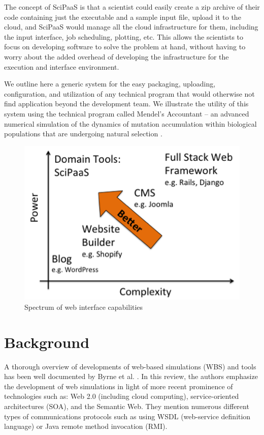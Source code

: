 \documentclass[10pt,reprint]{socc14}
\begin{document}
The concept of SciPaaS is that a scientist could easily create a zip archive of their code containing just the executable and a sample input file, upload it to the cloud, and SciPaaS would manage all the cloud infrastructure for them, including the input interface, job scheduling, plotting, etc.  This allows the scientists to focus on developing software to solve the problem at hand, without having to worry about the added overhead of developing the infrastructure for the execution and interface environment.

We outline here a generic system for the easy packaging, uploading, configuration, and utilization of any technical program that would otherwise not find application beyond the development team. We illustrate the utility of this system using the technical program called Mendel’s Accountant – an advanced numerical simulation of the dynamics of mutation accumulation within biological populations that are undergoing natural selection \cite{sanford07}.

\begin{figure}[t]
\centering
\includegraphics[natwidth=440,natheight=314]{figs/spectrum.png}
\caption{Spectrum of web interface capabilities \cite{karger14} \label{spectrum}}
\end{figure}

\section{Background}

A thorough overview of developments of web-based simulations (WBS) and tools has been well documented by Byrne et al. \cite{byrne10}.  In this review, the authors emphasize the development of web simulations in light of more recent prominence of technologies such as: Web 2.0 (including cloud computing), service-oriented architectures (SOA), and the Semantic Web.  They mention numerous different types of communications protocols such as using WSDL (web-service definition language) or Java remote method invocation (RMI).
\end{document}
